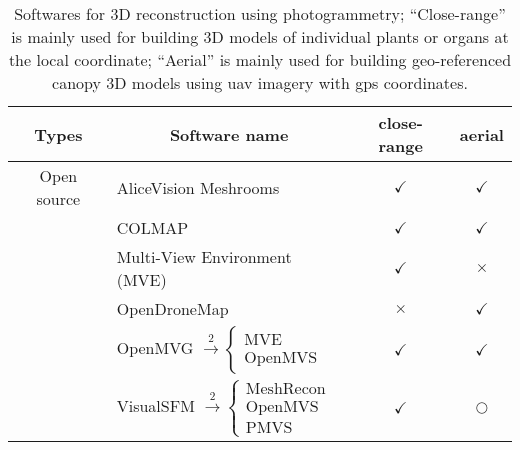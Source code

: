 \begin{table}[htb]
  \caption[Softwares for 3D reconstruction using photogrammetry]{Softwares for 3D reconstruction using photogrammetry; ``Close-range'' is mainly used for building 3D models of individual plants or organs at the local coordinate; ``Aerial'' is mainly used for building geo-referenced canopy 3D models using \gls{uav} imagery with \gls{gps} coordinates.}
  \label{tbl:int1}
    \begin{center}
      \begin{threeparttable}
      \begin{tabular*}{\linewidth}{@{\extracolsep{\fill}} clcc}
        \hline
        \multicolumn{1}{c}{\textbf{Types}} & \multicolumn{1}{c}{\textbf{Software name}}                                                                      & \textbf{close-range} & \textbf{aerial}     \\ \hline
        Open source                        & AliceVision Meshrooms                                                                                           & $\checkmark$         & $\checkmark$        \\
                                           & COLMAP                                                                                                          & $\checkmark$         & $\checkmark$        \\
                                           & Multi-View Environment (MVE)                                                                                    & $\checkmark$         & $\times$            \\
                                           & OpenDroneMap\tnote{1}                                                                                           & $\times$             & $\checkmark$        \\
                                           & OpenMVG $\stackrel{2}{\rightarrow} \begin{cases} \text{MVE} \\ \text{OpenMVS} \end{cases}$                      & $\checkmark$         & $\checkmark$        \\
                                           & VisualSFM $\stackrel{2}{\rightarrow} \begin{cases}\text{MeshRecon}\\ \text{OpenMVS} \\ \text{PMVS} \end{cases}$ & $\checkmark$         & $\bigcirc$\tnote{3} \\

\end{tabular*}
\end{threeparttable}
\end{center}
\end{table}
